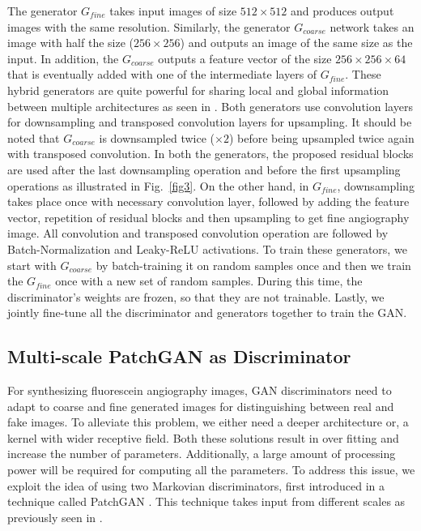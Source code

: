 \documentclass[runningheads]{llncs}
\begin{document}
The generator $G_{fine}$  takes input images of size $512\times 512$ and produces output images with the same resolution. Similarly, the generator $G_{coarse}$ network takes an image with half the size ($256\times 256$) and  outputs an image of the same size as the input. In addition, the $G_{coarse}$ outputs a feature vector of the size $256\times 256 \times 64$ that is eventually added with one of the intermediate layers of $G_{fine}$. These hybrid generators are quite powerful for sharing local and global information between multiple architectures as seen in \cite{johnson2016perceptual,shaham2019singan,wang2018high}. Both generators use convolution layers for downsampling and transposed convolution layers for upsampling. It should be noted that $G_{coarse}$ is downsampled twice ($\times 2$) before being upsampled twice again with transposed convolution. In both the generators, the proposed residual blocks are used after the last downsampling operation and before the first upsampling operations as illustrated in Fig.~\ref{fig3}. On the other hand, in $G_{fine}$, downsampling takes place once with necessary convolution layer, followed by adding the feature vector, repetition of residual blocks and then upsampling to get fine angiography image. All convolution and transposed convolution operation are followed by Batch-Normalization and Leaky-ReLU activations. To train these generators, we start with $G_{coarse}$ by batch-training it on random samples once and then we train the $G_{fine}$ once with a new set of random samples. During this time, the discriminator's weights are frozen, so that they are not trainable. Lastly, we jointly fine-tune  all the discriminator and generators together to train the GAN. 


\subsection{Multi-scale PatchGAN as Discriminator}\label{subsec:discriminators}

For synthesizing fluorescein angiography images, GAN discriminators need to adapt to coarse and fine  generated images for distinguishing between real and fake images. To alleviate this problem, we either need a deeper architecture or, a kernel with wider receptive field. Both these solutions result in over fitting and increase the number of parameters. Additionally, a large amount of processing power will be required for computing all the parameters. To address this issue, we exploit the idea of using two Markovian discriminators, first introduced in a technique called PatchGAN \cite{li2016precomputed}. This technique takes input from different scales as previously seen in \cite{wang2018high,shaham2019singan}. 
\end{document}
